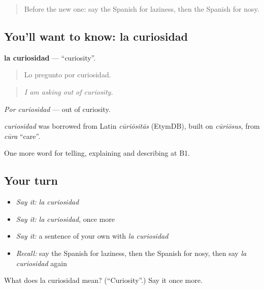 \begin{quote}
Before the new one: say the Spanish for laziness, then the Spanish for nosy.
\end{quote}

\subsection*{You'll want to know: la curiosidad}
\textbf{la curiosidad} — \textquotedblleft{}curiosity\textquotedblright{}.

\begin{quote}
Lo pregunto por curiosidad.
\end{quote}

\begin{quote}
\emph{I am asking out of curiosity.}
\end{quote}

\emph{Por curiosidad} — out of curiosity.

\begin{cousinweb}
\emph{curiosidad} was borrowed from Latin \emph{cūriōsitās} (EtymDB), built on \emph{cūriōsus}, from \emph{cūra} \textquotedblleft{}care\textquotedblright{}.
\end{cousinweb}

\begin{grammarlens}[title={What you've built}]
One more word for telling, explaining and describing at B1.
\end{grammarlens}

\subsection*{Your turn}
\begin{itemize}
\raggedright
  \item \emph{Say it:} \emph{la curiosidad}
  \item \emph{Say it:} \emph{la curiosidad}, once more
  \item \emph{Say it:} a sentence of your own with \emph{la curiosidad}
  \item \emph{Recall:} say the Spanish for laziness, then the Spanish for nosy, then say \emph{la curiosidad} again
\end{itemize}

\begin{tcolorbox}[breakable,colback=teal!4,colframe=teal!35!black,title={Before you move on}]
What does la curiosidad mean? (\textquotedblleft{}Curiosity\textquotedblright{}.) Say it once more.
\end{tcolorbox}
